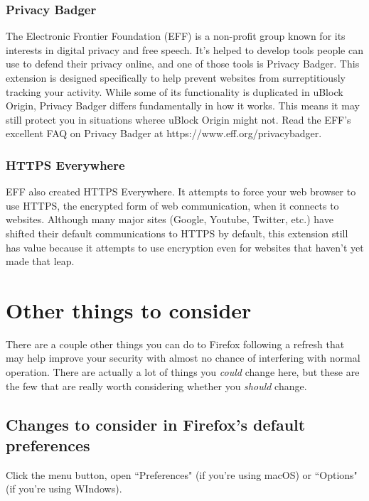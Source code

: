 \documentclass[fontsize=11pt]{article}
\begin{document}
\subsubsection{Privacy Badger}
The Electronic Frontier Foundation (EFF) is a non-profit group known for its interests in digital privacy and free speech.  It's helped to develop tools people can use to defend their privacy online, and one of those tools is Privacy Badger.  This extension is designed specifically to help prevent websites from surreptitiously tracking your activity.  While some of its functionality is duplicated in uBlock Origin, Privacy Badger differs fundamentally in how it works.  This means it may still protect you in situations wheree uBlock Origin might not.  Read the EFF's excellent FAQ on Privacy Badger at https://www.eff.org/privacybadger.


\subsubsection{HTTPS Everywhere}
 EFF also created HTTPS Everywhere.  It attempts to force your web browser to use HTTPS, the encrypted form of web communication, when it connects to websites.  Although many major sites (Google, Youtube, Twitter, etc.) have shifted their default communications to HTTPS by default, this extension still has value because it attempts to use encryption even for websites that haven't yet made that leap.



\section{Other things to consider}
There are a couple other things you can do to Firefox following a refresh that may help improve your security with almost no chance of interfering with normal operation.  There are actually a lot of things you \emph{could} change here, but these are the few that are really worth considering whether you \emph{should} change.

\subsection{Changes to consider in Firefox's default preferences}
Click the menu button, open ``Preferences" (if you're using macOS) or ``Options" (if you're using WIndows).
\end{document}
